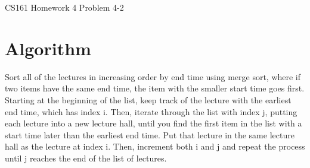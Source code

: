 \documentclass[12pt]{article}
\begin{document}
\begin{center}
{\Large CS161 Homework 4 Problem 4-2}

\end{center}

\section*{Algorithm}
Sort all of the lectures in increasing order by end time using merge sort, where if two items have the same end time, the item with the smaller start time goes first. Starting at the beginning of the list, keep track of the lecture with the earliest end time, which has index i. Then, iterate through the list with index j, putting each lecture into a new lecture hall, until you find the first item in the list with a start time later than the earliest end time. Put that lecture in the same lecture hall as the lecture at index i. Then, increment both i and j and repeat the process until j reaches the end of the list of lectures.
\end{document}

